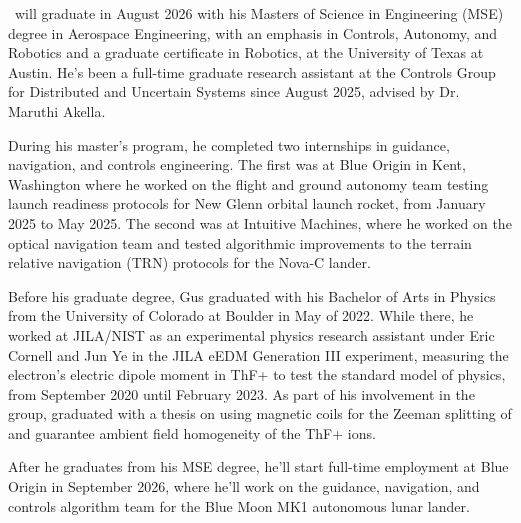 
\begin{vita}

\theauthor\ will graduate in August 2026 with his Masters of Science in Engineering (MSE) degree in Aerospace Engineering, with an emphasis in Controls, Autonomy, and Robotics and a graduate certificate in Robotics, at the University of Texas at Austin. He's been a full-time graduate research assistant at the Controls Group for Distributed and Uncertain Systems since August 2025, advised by Dr. Maruthi Akella.

During his master's program, he completed two internships in guidance, navigation, and controls engineering. The first was at Blue Origin in Kent, Washington where he worked on the flight and ground autonomy team testing launch readiness protocols for New Glenn orbital launch rocket, from January 2025 to May 2025. The second was at Intuitive Machines, where he worked on the optical navigation team and tested algorithmic improvements to the terrain relative navigation (TRN) protocols for the Nova-C lander.

Before his graduate degree, Gus graduated with his Bachelor of Arts in Physics from the University of Colorado at Boulder in May of 2022. While there, he worked at JILA/NIST as an experimental physics research assistant under Eric Cornell and Jun Ye in the JILA eEDM Generation III experiment, measuring the electron's electric dipole moment in ThF+ to test the standard model of physics, from September 2020 until February 2023. As part of his involvement in the group, graduated with a thesis on using magnetic coils for the Zeeman splitting of and guarantee ambient field homogeneity of the ThF+ ions.

After he graduates from his MSE degree, he'll start full-time employment at Blue Origin in September 2026, where he'll work on the guidance, navigation, and controls algorithm team for the Blue Moon MK1 autonomous lunar lander.




\end{vita}
